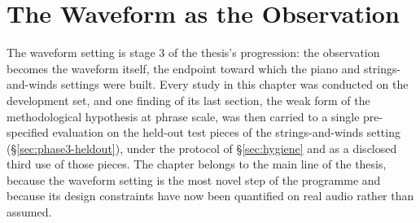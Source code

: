 \chapter{The Waveform as the Observation}\label{ch:phase3}\label{app:phase3}\label{sec:phase3-math}
The waveform setting is stage 3 of the thesis's progression: the
observation becomes the waveform itself, the endpoint toward which the
piano and strings-and-winds settings were built. Every study in this
chapter was conducted on the development set, and one finding of its last
section, the weak form of the methodological hypothesis at phrase scale,
was then carried to a single pre-specified evaluation on the held-out test
pieces of the strings-and-winds setting (\S\ref{sec:phase3-heldout}), under
the protocol of \S\ref{sec:hygiene} and as a disclosed third use of those
pieces. The chapter belongs to the main line of
the thesis, because the waveform setting is the most novel step of the
programme and because its design constraints have now been quantified on
real audio rather than assumed.

